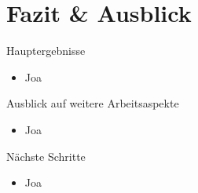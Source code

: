 \documentclass[usenames, dvipsnames, aspectratio=32]{beamer}
\begin{document}
\section{Fazit \& Ausblick}

\begin{frame}{Hauptergebnisse}
    \begin{itemize}
        \item Joa
    \end{itemize}
\end{frame}

\begin{frame}{Ausblick auf weitere Arbeitsaspekte}
    \begin{itemize}
        \item Joa
    \end{itemize}
\end{frame}

\begin{frame}{Nächste Schritte}
    \begin{itemize}
        \item Joa
    \end{itemize}
\end{frame}
\end{document}
